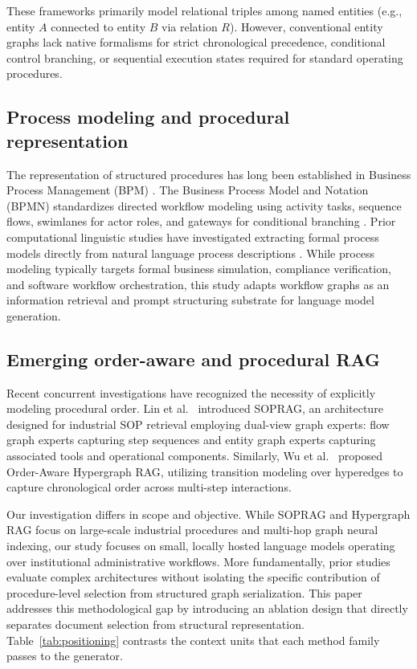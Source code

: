 \documentclass[preprint,10pt]{elsarticle}
\begin{document}
These frameworks primarily model relational triples among named entities (e.g., entity $A$ connected to entity $B$ via relation $R$). However, conventional entity graphs lack native formalisms for strict chronological precedence, conditional control branching, or sequential execution states required for standard operating procedures.

\subsection{Process modeling and procedural representation}
The representation of structured procedures has long been established in Business Process Management (BPM) \cite{dumas2018fundamentals}. The Business Process Model and Notation (BPMN) standardizes directed workflow modeling using activity tasks, sequence flows, swimlanes for actor roles, and gateways for conditional branching \cite{omg2011bpmn}. Prior computational linguistic studies have investigated extracting formal process models directly from natural language process descriptions \cite{friedrich2011process}. While process modeling typically targets formal business simulation, compliance verification, and software workflow orchestration, this study adapts workflow graphs as an information retrieval and prompt structuring substrate for language model generation.

\subsection{Emerging order-aware and procedural RAG}
Recent concurrent investigations have recognized the necessity of explicitly modeling procedural order. Lin et al.\ \cite{lin2026sedrag} introduced SOPRAG, an architecture designed for industrial SOP retrieval employing dual-view graph experts: flow graph experts capturing step sequences and entity graph experts capturing associated tools and operational components. Similarly, Wu et al.\ \cite{wu2026okhrag} proposed Order-Aware Hypergraph RAG, utilizing transition modeling over hyperedges to capture chronological order across multi-step interactions.

Our investigation differs in scope and objective. While SOPRAG and Hypergraph RAG focus on large-scale industrial procedures and multi-hop graph neural indexing, our study focuses on small, locally hosted language models operating over institutional administrative workflows. More fundamentally, prior studies evaluate complex architectures without isolating the specific contribution of procedure-level selection from structured graph serialization. This paper addresses this methodological gap by introducing an ablation design that directly separates document selection from structural representation. Table~\ref{tab:positioning} contrasts the context units that each method family passes to the generator.
\end{document}
